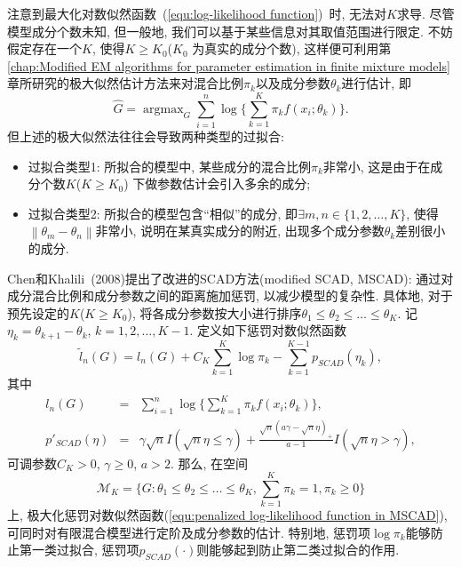 \documentclass[a4paper,12pt,openany,oneside,utf-8]{ctexbook}
\begin{document}
注意到最大化对数似然函数~(\ref{equ:log-likelihood function})~时, 无法对$K$求导. 尽管模型成分个数未知, 但一般地, 我们可以基于某些信息对其取值范围进行限定. 不妨假定存在一个$K$, 使得$K \geq K_0$($K_0 $ 为真实的成分个数), 这样便可利用第\ref{chap:Modified EM algorithms for parameter estimation in finite mixture models}章所研究的极大似然估计方法来对混合比例$\pi_{k}$以及成分参数$\theta_{k}$进行估计, 即
\begin{equation}
  \hat{G}=\mathop{\arg\max}_{G} \sum_{i=1}^{n}\log\{\sum_{k=1}^{K}\pi_{k}f(x_{i}; \theta_{k})\}.
\end{equation}
但上述的极大似然法往往会导致两种类型的过拟合:
\begin{itemize}
\item 过拟合类型1: 所拟合的模型中, 某些成分的混合比例$\pi_{k}$非常小, 这是由于在成分个数$K$($K \geq K_0$) 下做参数估计会引入多余的成分;
\item 过拟合类型2: 所拟合的模型包含“相似”的成分, 即$\exists m,n \in \{1,2,\ldots,K\}$, 使得$\left \| \theta_{m}-\theta_{n} \right \|$非常小, 说明在某真实成分的附近, 出现多个成分参数$\theta_{k}$差别很小的成分.
\end{itemize}

Chen和Khalili~(2008)提出了改进的SCAD方法(modified SCAD, MSCAD): 通过对成分混合比例和成分参数之间的距离施加惩罚, 以减少模型的复杂性. 具体地, 对于预先设定的$K$($K \geq K_0$), 将各成分参数按大小进行排序$\theta_{1} \leq \theta_{2} \leq \ldots \leq \theta_{K}$. 记$\eta_{k}=\theta_{k+1}-\theta_{k}$, $k=1, 2, \ldots, K-1$. 定义如下惩罚对数似然函数
\begin{equation}
\label{equ:penalized log-likelihood function in MSCAD}
  \tilde{l}_{n}(G)=l_{n}(G) + C_{K}\sum_{k=1}^{K}\log\pi_{k} - \sum_{k=1}^{K-1}p_{SCAD}(\eta_{k}),
\end{equation}
其中
\begin{eqnarray*}
  l_{n}(G)&=&\sum_{i=1}^{n}\log\{\sum_{k=1}^{K}\pi_{k}f(x_{i}; \theta_{k})\},  \nonumber\\
  {p}'_{SCAD}(\eta)&=&\gamma \sqrt{n} I(\sqrt{n}\eta \leq \gamma) + \frac{\sqrt{n}(a\gamma-\sqrt{n}\eta)_{+}}{a-1} I(\sqrt{n}\eta > \gamma),
\end{eqnarray*}
可调参数$C_{K}>0$, $\gamma \geq 0$, $a>2$. 那么, 在空间
\begin{equation*}
  \mathcal{M}_{K}=\{G: \theta_{1}\leq\theta_{2}\leq \ldots \leq\theta_{K}, \sum_{k=1}^{K}\pi_{k}=1, \pi_{k}\geq0\}
\end{equation*}
上, 极大化惩罚对数似然函数(\ref{equ:penalized log-likelihood function in MSCAD}), 可同时对有限混合模型进行定阶及成分参数的估计. 特别地, 惩罚项$\log\pi_{k}$能够防止第一类过拟合, 惩罚项$p_{SCAD}(\cdot)$则能够起到防止第二类过拟合的作用.
\end{document}
